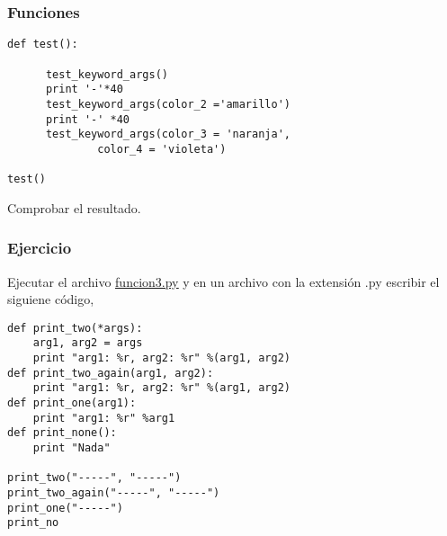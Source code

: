 \documentclass[10pt]{beamer}
\begin{document}
\begin{frame}[fragile]
\frametitle{Funciones}


\vspace{0.3cm}

\begin{lstlisting}
def test():

      test_keyword_args()
      print '-'*40
      test_keyword_args(color_2 ='amarillo')
      print '-' *40
      test_keyword_args(color_3 = 'naranja',
              color_4 = 'violeta')
  
test()

\end{lstlisting}

Comprobar el resultado. 
\end{frame}

\begin{frame}[fragile]
\frametitle{Ejercicio }
\vspace{0.2cm}

Ejecutar el archivo \href{run:funcion1.py}{\underline{funcion3.py}} y  en un archivo con la extensi\'on .py  escribir el siguiene c\'odigo,

\vspace{0.3cm}
 

\begin{lstlisting}
def print_two(*args):
    arg1, arg2 = args
    print "arg1: %r, arg2: %r" %(arg1, arg2)
def print_two_again(arg1, arg2):
    print "arg1: %r, arg2: %r" %(arg1, arg2)
def print_one(arg1):
    print "arg1: %r" %arg1
def print_none():
    print "Nada"

print_two("-----", "-----")
print_two_again("-----", "-----")
print_one("-----")
print_no
\end{lstlisting}


\end{frame}

\end{document}
